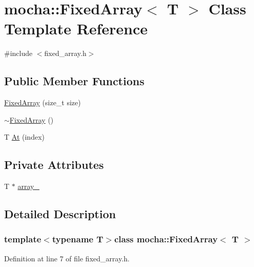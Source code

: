\hypertarget{classmocha_1_1_fixed_array}{
\section{mocha::FixedArray$<$ T $>$ Class Template Reference}
\label{classmocha_1_1_fixed_array}
}


{\ttfamily \#include $<$fixed\_\-array.h$>$}

\subsection*{Public Member Functions}
\begin{DoxyCompactItemize}
\item 
\hyperlink{classmocha_1_1_fixed_array_a7094f7b664f15c54a126813a8b6481fa}{FixedArray} (size\_\-t size)
\item 
\hyperlink{classmocha_1_1_fixed_array_a79932ad171f72ce03bb8922473007fde}{$\sim$FixedArray} ()
\item 
T \hyperlink{classmocha_1_1_fixed_array_aef26e524fa960f7544d7bfc71b0f66de}{At} (index)
\end{DoxyCompactItemize}
\subsection*{Private Attributes}
\begin{DoxyCompactItemize}
\item 
T $\ast$ \hyperlink{classmocha_1_1_fixed_array_a14f9426748f9a44173cd4541131b8617}{array\_\-}
\end{DoxyCompactItemize}


\subsection{Detailed Description}
\subsubsection*{template$<$typename T$>$class mocha::FixedArray$<$ T $>$}



Definition at line 7 of file fixed\_\-array.h.



